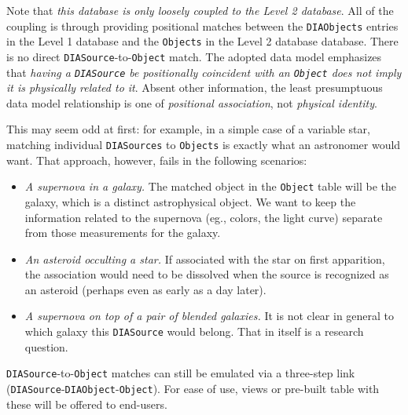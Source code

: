 \documentclass[12pt]{article}
\newcommand{\code}[1]{\texttt{#1}}
\newcommand{\DIASource}{\code{DIASource}\xspace}
\newcommand{\DIASources}{\code{DIASources}\xspace}
\newcommand{\DIAObject}{\code{DIAObject}\xspace}
\newcommand{\DIAObjects}{\code{DIAObjects}\xspace}
\newcommand{\DB}{{Level 1 database}\xspace}
\newcommand{\DR}{{Level 2 database}\xspace}
\newcommand{\Object}{\code{Object}\xspace}
\newcommand{\Objects}{\code{Objects}\xspace}
\newcommand{\SSObject}{\code{SSObject}\xspace}
\begin{document}
Note that {\em this database is only loosely coupled to the \DR}. All of the coupling is through providing positional matches between the \DIAObjects entries in the \DB and the \Objects in the \DR database. There is no direct \DIASource-to-\Object match. The adopted data model emphasizes that {\em having a \DIASource be positionally coincident with an \Object does not imply it is physically related to it}. Absent other information, the least presumptuous data model relationship is one of {\em positional association}, not {\em physical identity}.

This may seem odd at first: for example, in a simple case of a variable star, matching individual \DIASources to \Objects is exactly what an astronomer would want. That approach, however, fails in the following scenarios:
\begin{itemize}
\item {\em A supernova in a galaxy.} The matched object in the \Object table will be the galaxy, which is a distinct astrophysical object. We want to keep the information related to the supernova (eg., colors, the light curve) separate from those measurements for the galaxy.
\item {\em An asteroid occulting a star.} If associated with the star on first apparition, the association would need to be dissolved when the source is recognized as an asteroid (perhaps even as early as a day later).
\item {\em A supernova on top of a pair of blended galaxies.} It is not clear in general to which galaxy this \DIASource would belong. That in itself is a research question.
\end{itemize}

\vspace{1ex}
\DIASource-to-\Object matches can still be emulated via a three-step link (\DIASource-\DIAObject-\Object). For ease of use, views or pre-built table with these will be offered to end-users.

\end{document}
